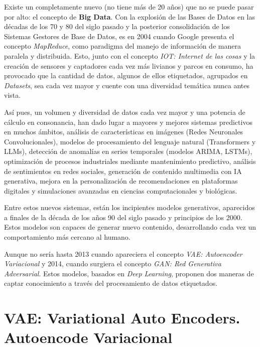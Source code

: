 Existe un completamente nuevo (no tiene más de 20 años) que no se puede pasar por alto: el concepto de \textbf{Big Data}. Con la explosión de las Bases de Datos en las décadas de los 70 y 80 del siglo pasado y la posterior consolidación de los Sistemas Gestores de Base de Datos, es en 2004 cuando Google presenta el concepto \emph{MapReduce}, como paradigma del manejo de información de manera paralela y distribuida. Esto, junto con el concepto \emph{IOT: Internet de las cosas} y la creación de sensores y captadores cada vez más livianos y parcos en consumo, ha provocado que la cantidad de datos, algunos de ellos etiquetados, agrupados en \emph{Datasets}, sea cada vez mayor y cuente con una diversidad temática nunca antes vista.

Así pues, un volumen y diversidad de datos cada vez mayor y una potencia de cálculo en consonancia, han dado lugar a mayores y mejores sistemas predictivos en muchos ámbitos, análisis de características en imágenes (Redes Neuronales Convolucionales), modelos de procesamiento del lenguaje natural (Transformers y LLMs), detección de anomalías en series temporales (modelos ARIMA, LSTMs), optimización de procesos industriales mediante mantenimiento predictivo, análisis de sentimientos en redes sociales, generación de contenido multimedia con IA generativa, mejora en la personalización de recomendaciones en plataformas digitales y simulaciones avanzadas en ciencias computacionales y biológicas.

Entre estos nuevos sistemas, están los incipientes modelos generativos, aparecidos a finales de la década de los años 90 del siglo pasado y principios de los 2000. Estos modelos son capaces de generar nuevo contenido, desarrollando cada vez un comportamiento más cercano al humano.

Aunque no sería hasta 2013 cuando apareciera el concepto \emph{VAE: Autoencoder Variacional} y 2014, cuando surgiera el concepto \emph{GAN: Red Generativa Adversarial}. Estos modelos, basados en \emph{Deep Learning}, proponen dos maneras de captar conocimiento a través del procesamiento de datos etiquetados.

\section{VAE: Variational Auto Encoders. Autoencode Variacional}


